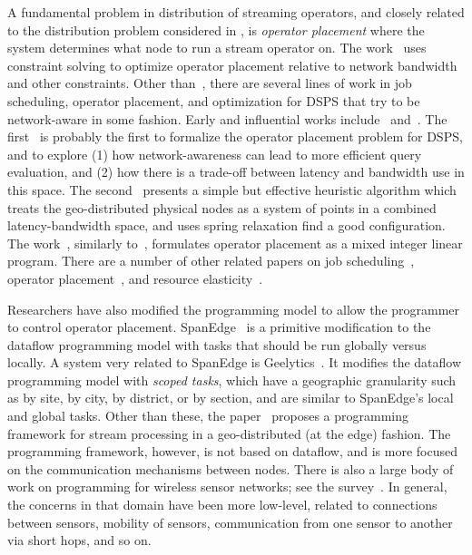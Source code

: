 A fundamental problem in distribution of streaming operators, and closely related to the distribution problem considered in ,
is \emph{operator placement} where the system determines what node to run a stream operator on.
The work~\cite{cardellini2016optimal} uses constraint solving to optimize operator placement relative to network bandwidth and other constraints.
Other than~\cite{cardellini2016optimal}, there are several lines of work in job scheduling, operator placement, and optimization for DSPS that try to be network-aware in some fashion. Early and influential works include~\cite{ahmad2004network} and~\cite{pietzuch2006network}.
The first~\cite{ahmad2004network} is probably the first to formalize the operator placement problem for DSPS, and to explore (1) how network-awareness can lead to more efficient query evaluation, and (2) how there is a trade-off between latency and bandwidth use in this space.
The second~\cite{pietzuch2006network} presents a simple but effective heuristic algorithm which treats the geo-distributed physical nodes as a system of points in a combined latency-bandwidth space, and uses spring relaxation find a good configuration.
The work~\cite{gu2015general}, similarly to~\cite{cardellini2016optimal}, formulates operator placement as a mixed integer linear program.
There are a number of other related papers on job scheduling~\cite{aniello2013adaptive,xu2014tstorm,eidenbenz2016task,wolf2008soda,fu2019edgewise}, operator placement~\cite{bonfils2004adaptive,tziritas2016improving,rizou2010solving,lakshmanan2008placement},
and resource elasticity~\cite{cardellini2018decentralized,hochreiner2016elastic,cardellini2018optimal,dias2018dsp-survey}.

Researchers have also modified the programming model to allow the programmer to control operator placement.
SpanEdge~\cite{sajjad2016spanedge} is a primitive modification to the dataflow programming model with tasks that should be run globally versus locally.
A system very related to SpanEdge is Geelytics~\cite{cheng2015geelytics}.
It modifies the dataflow programming model with \emph{scoped tasks}, which have a geographic granularity such as by site, by city, by district, or by section, and are similar to SpanEdge's local and global tasks.
Other than these, the paper~\cite{renart2017datadrivenstreamedge} proposes a programming framework for stream processing in a geo-distributed (at the edge) fashion. The programming framework, however, is not based on dataflow, and is more focused on the communication mechanisms between nodes. There is also a large body of work on programming for wireless sensor networks; see the survey~\cite{mottola2011programming-wsn}. In general, the concerns in that domain have been more low-level, related to connections between sensors, mobility of sensors, communication from one sensor to another via short hops, and so on.

